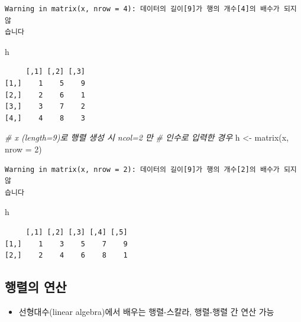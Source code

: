 \documentclass[
  11pt,
]{krantz}
\newenvironment{Shaded}{\begin{snugshade}}{\end{snugshade}}
\newcommand{\AttributeTok}[1]{\textcolor[rgb]{0.61,0.61,0.61}{#1}}
\newcommand{\CommentTok}[1]{\textcolor[rgb]{0.37,0.37,0.37}{\textit{#1}}}
\newcommand{\DecValTok}[1]{\textcolor[rgb]{0.06,0.06,0.06}{#1}}
\newcommand{\FunctionTok}[1]{\textcolor[rgb]{0,0,0}{#1}}
\newcommand{\NormalTok}[1]{#1}
\newcommand{\OtherTok}[1]{\textcolor[rgb]{0.37,0.37,0.37}{#1}}
\providecommand{\tightlist}{%
  \setlength{\itemsep}{0pt}\setlength{\parskip}{0pt}}
\begin{document}
\begin{verbatim}
Warning in matrix(x, nrow = 4): 데이터의 길이[9]가 행의 개수[4]의 배수가 되지 않
습니다
\end{verbatim}

\begin{Shaded}
\begin{Highlighting}[]
\NormalTok{h}
\end{Highlighting}
\end{Shaded}

\begin{verbatim}
     [,1] [,2] [,3]
[1,]    1    5    9
[2,]    2    6    1
[3,]    3    7    2
[4,]    4    8    3
\end{verbatim}

\begin{Shaded}
\begin{Highlighting}[]
\CommentTok{\# x (length=9)로 행렬 생성 시 ncol=2 만 }
\CommentTok{\# 인수로 입력한 경우}
\NormalTok{h }\OtherTok{\textless{}{-}} \FunctionTok{matrix}\NormalTok{(x, }\AttributeTok{nrow =} \DecValTok{2}\NormalTok{)}
\end{Highlighting}
\end{Shaded}

\begin{verbatim}
Warning in matrix(x, nrow = 2): 데이터의 길이[9]가 행의 개수[2]의 배수가 되지 않
습니다
\end{verbatim}

\begin{Shaded}
\begin{Highlighting}[]
\NormalTok{h}
\end{Highlighting}
\end{Shaded}

\begin{verbatim}
     [,1] [,2] [,3] [,4] [,5]
[1,]    1    3    5    7    9
[2,]    2    4    6    8    1
\end{verbatim}

\normalsize

\hypertarget{matrix-operation}{%
\subsection{행렬의 연산}\label{matrix-operation}}

\begin{itemize}
\tightlist
\item
  선형대수(linear algebra)에서 배우는 행렬-스칼라, 행렬-행렬 간 연산 가능
\end{itemize}
\end{document}
